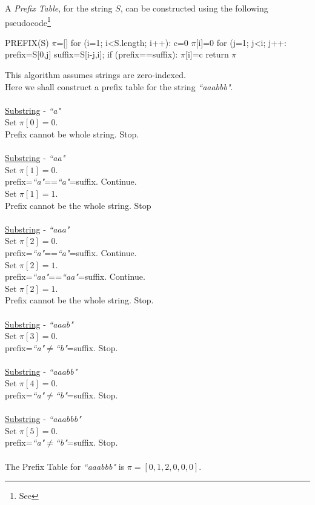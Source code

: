 \documentclass[11pt,a4paper]{article}
\begin{document}
A \textit{Prefix Table}, for the string $S$, can be constructed using the following pseudocode\footnote{See }
\begin{code}
PREFIX(S)
$\pi$=[]
for (i=1; i<S.length; i++):
  c=0
  $\pi$[i]=0
  for (j=1; j<i; j++:
    prefix=S[0,j]
    suffix=S[i-j,i];
    if (prefix==suffix):
      $\pi$[i]=c
return $\pi$
\end{code}
\nb This algorithm assumes strings are zero-indexed.\\

Here we shall construct a prefix table for the string \textit{``aaabbb"}.\\
\\\underline{Substring} - \textit{``a"}\\
Set $\pi[0]=0$.\\
Prefix cannot be whole string. Stop.\\
\\\underline{Substring} - \textit{``aa"}\\
Set $\pi[1]=0$.\\
prefix=\textit{``a"}==\textit{``a"}=suffix. Continue.\\
Set $\pi[1]=1$.\\
Prefix cannot be the whole string. Stop\\
\\\underline{Substring} - \textit{``aaa"}\\
Set $\pi[2]=0$.\\
prefix=\textit{``a"}==\textit{``a"}=suffix. Continue.\\
Set $\pi[2]=1$.\\
prefix=\textit{``aa"}==\textit{``aa"}=suffix. Continue.\\
Set $\pi[2]=1$.\\
Prefix cannot be the whole string. Stop.\\
\\\underline{Substring} - \textit{``aaab"}\\
Set $\pi[3]=0$.\\
prefix=\textit{``a"}$\neq$\textit{``b"}=suffix. Stop.\\
\\\underline{Substring} - \textit{``aaabb"}\\
Set $\pi[4]=0$.\\
prefix=\textit{``a"}$\neq$\textit{``b"}=suffix. Stop.\\
\\\underline{Substring} - \textit{``aaabbb"}\\
Set $\pi[5]=0$.\\
prefix=\textit{``a"}$\neq$\textit{``b"}=suffix. Stop.\\
\\The Prefix Table for \textit{``aaabbb"} is $\pi=[0,1,2,0,0,0]$.\\
\end{document}
